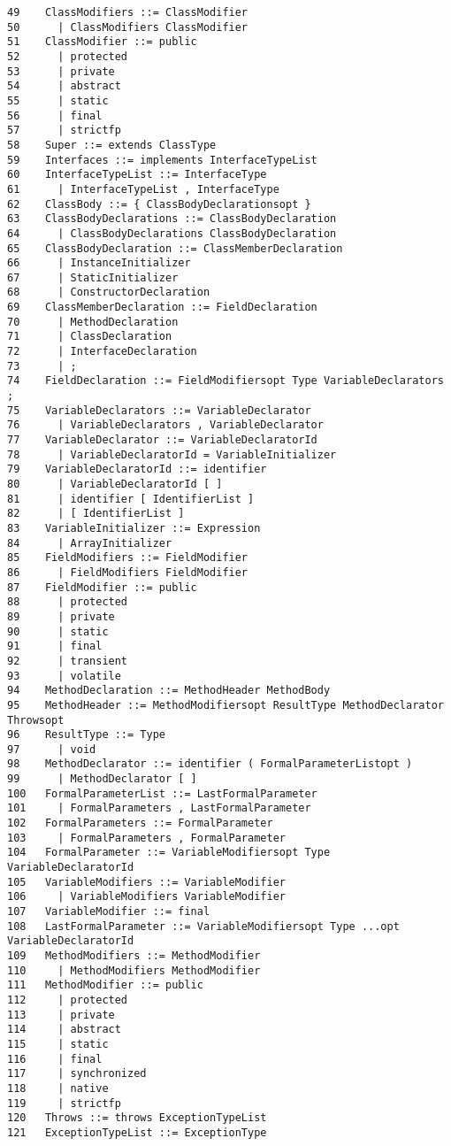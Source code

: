 \begin{verbatim}
49    ClassModifiers ::= ClassModifier
50      | ClassModifiers ClassModifier
51    ClassModifier ::= public
52      | protected
53      | private
54      | abstract
55      | static
56      | final
57      | strictfp
58    Super ::= extends ClassType
59    Interfaces ::= implements InterfaceTypeList
60    InterfaceTypeList ::= InterfaceType
61      | InterfaceTypeList , InterfaceType
62    ClassBody ::= { ClassBodyDeclarationsopt }
63    ClassBodyDeclarations ::= ClassBodyDeclaration
64      | ClassBodyDeclarations ClassBodyDeclaration
65    ClassBodyDeclaration ::= ClassMemberDeclaration
66      | InstanceInitializer
67      | StaticInitializer
68      | ConstructorDeclaration
69    ClassMemberDeclaration ::= FieldDeclaration
70      | MethodDeclaration
71      | ClassDeclaration
72      | InterfaceDeclaration
73      | ;
74    FieldDeclaration ::= FieldModifiersopt Type VariableDeclarators ;
75    VariableDeclarators ::= VariableDeclarator
76      | VariableDeclarators , VariableDeclarator
77    VariableDeclarator ::= VariableDeclaratorId
78      | VariableDeclaratorId = VariableInitializer
79    VariableDeclaratorId ::= identifier
80      | VariableDeclaratorId [ ]
81      | identifier [ IdentifierList ]
82      | [ IdentifierList ]
83    VariableInitializer ::= Expression
84      | ArrayInitializer
85    FieldModifiers ::= FieldModifier
86      | FieldModifiers FieldModifier
87    FieldModifier ::= public
88      | protected
89      | private
90      | static
91      | final
92      | transient
93      | volatile
94    MethodDeclaration ::= MethodHeader MethodBody
95    MethodHeader ::= MethodModifiersopt ResultType MethodDeclarator Throwsopt
96    ResultType ::= Type
97      | void
98    MethodDeclarator ::= identifier ( FormalParameterListopt )
99      | MethodDeclarator [ ]
100   FormalParameterList ::= LastFormalParameter
101     | FormalParameters , LastFormalParameter
102   FormalParameters ::= FormalParameter
103     | FormalParameters , FormalParameter
104   FormalParameter ::= VariableModifiersopt Type VariableDeclaratorId
105   VariableModifiers ::= VariableModifier
106     | VariableModifiers VariableModifier
107   VariableModifier ::= final
108   LastFormalParameter ::= VariableModifiersopt Type ...opt VariableDeclaratorId
109   MethodModifiers ::= MethodModifier
110     | MethodModifiers MethodModifier
111   MethodModifier ::= public
112     | protected
113     | private
114     | abstract
115     | static
116     | final
117     | synchronized
118     | native
119     | strictfp
120   Throws ::= throws ExceptionTypeList
121   ExceptionTypeList ::= ExceptionType

\end{verbatim}
